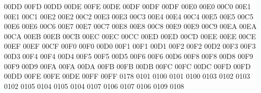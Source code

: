 \setcclcucx 00DD 00FD 00DD %
\setcclcucx 00DE 00FE 00DE %
\setcclcucx 00DF 00DF 00DF %
\setcclcucx 00E0 00E0 00C0 %
\setcclcucx 00E1 00E1 00C1 %
\setcclcucx 00E2 00E2 00C2 %
\setcclcucx 00E3 00E3 00C3 %
\setcclcucx 00E4 00E4 00C4 %
\setcclcucx 00E5 00E5 00C5 %
\setcclcucx 00E6 00E6 00C6 %
\setcclcucx 00E7 00E7 00C7 %
\setcclcucx 00E8 00E8 00C8 %
\setcclcucx 00E9 00E9 00C9 %
\setcclcucx 00EA 00EA 00CA %
\setcclcucx 00EB 00EB 00CB %
\setcclcucx 00EC 00EC 00CC %
\setcclcucx 00ED 00ED 00CD %
\setcclcucx 00EE 00EE 00CE %
\setcclcucx 00EF 00EF 00CF %
\setcclcucx 00F0 00F0 00D0 %
\setcclcucx 00F1 00F1 00D1 %
\setcclcucx 00F2 00F2 00D2 %
\setcclcucx 00F3 00F3 00D3 %
\setcclcucx 00F4 00F4 00D4 %
\setcclcucx 00F5 00F5 00D5 %
\setcclcucx 00F6 00F6 00D6 %
\setcclcucx 00F8 00F8 00D8 %
\setcclcucx 00F9 00F9 00D9 %
\setcclcucx 00FA 00FA 00DA %
\setcclcucx 00FB 00FB 00DB %
\setcclcucx 00FC 00FC 00DC %
\setcclcucx 00FD 00FD 00DD %
\setcclcucx 00FE 00FE 00DE %
\setcclcucx 00FF 00FF 0178 %
 0101 0100 %
 0101 0100 %
 0103 0102 %
 0103 0102 %
 0105 0104 %
 0105 0104 %
 0107 0106 %
 0107 0106 %
 0109 0108 %
